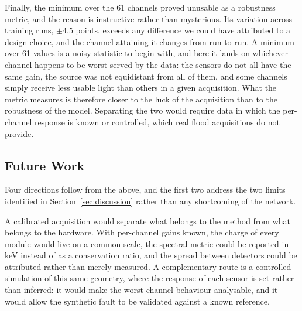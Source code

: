 \documentclass[10pt,conference]{IEEEtran}
\begin{document}
Finally, the minimum over the 61 channels proved unusable as a robustness
metric, and the reason is instructive rather than mysterious. Its variation
across training runs, $\pm 4.5$ points, exceeds any difference we could have
attributed to a design choice, and the channel attaining it changes from run to
run. A minimum over 61 values is a noisy statistic to begin with, and here it
lands on whichever channel happens to be worst served by the data: the sensors
do not all have the same gain, the source was not equidistant from all of them,
and some channels simply receive less usable light than others in a given
acquisition. What the metric measures is therefore closer to the luck of the
acquisition than to the robustness of the model. Separating the two would
require data in which the per-channel response is known or controlled, which
real flood acquisitions do not provide.

\subsection{Future Work}

Four directions follow from the above, and the first two address the two
limits identified in Section~\ref{sec:discussion} rather than any shortcoming of
the network.

A calibrated acquisition would separate what belongs to the method from what
belongs to the hardware. With per-channel gains known, the charge of every
module would live on a common scale, the spectral metric could be reported in
keV instead of as a conservation ratio, and the spread between detectors could
be attributed rather than merely measured. A complementary route is a
controlled simulation of this same geometry, where the response of each sensor
is set rather than inferred: it would make the worst-channel behaviour
analysable, and it would allow the synthetic fault to be validated against a
known reference.
\end{document}
